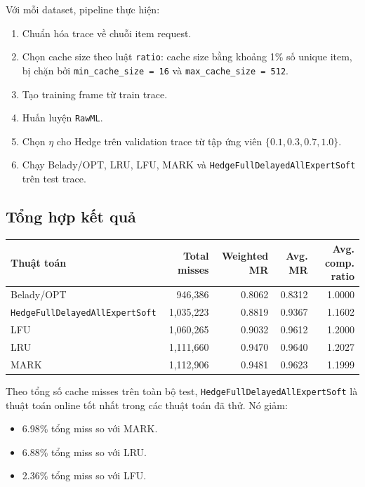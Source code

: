 \documentclass[11pt,a4paper]{article}
\newcommand{\code}[1]{\texttt{#1}}
\newcommand{\hedge}{\code{HedgeFullDelayedAllExpertSoft}}
\newcommand{\rawml}{\code{RawML}}
\begin{document}
Với mỗi dataset, pipeline thực hiện:

\begin{enumerate}[leftmargin=1.4em]
    \item Chuẩn hóa trace về chuỗi item request.
    \item Chọn cache size theo luật \code{ratio}: cache size bằng khoảng 1\% số unique item, bị chặn bởi \code{min\_cache\_size = 16} và \code{max\_cache\_size = 512}.
    \item Tạo training frame từ train trace.
    \item Huấn luyện \rawml{}.
    \item Chọn \(\eta\) cho Hedge trên validation trace từ tập ứng viên \(\{0.1, 0.3, 0.7, 1.0\}\).
    \item Chạy Belady/OPT, LRU, LFU, MARK và \hedge{} trên test trace.
\end{enumerate}

\subsection{Tổng hợp kết quả}

\begin{center}
\begin{tabular}{lrrrr}
\toprule
Thuật toán & Total misses & Weighted MR & Avg. MR & Avg. comp. ratio \\
\midrule
Belady/OPT & 946,386 & 0.8062 & 0.8312 & 1.0000 \\
\hedge{} & 1,035,223 & 0.8819 & 0.9367 & 1.1602 \\
LFU & 1,060,265 & 0.9032 & 0.9612 & 1.2000 \\
LRU & 1,111,660 & 0.9470 & 0.9640 & 1.2027 \\
MARK & 1,112,906 & 0.9481 & 0.9623 & 1.1999 \\
\bottomrule
\end{tabular}
\end{center}

Theo tổng số cache misses trên toàn bộ test, \hedge{} là thuật toán online tốt nhất trong các thuật toán đã thử. Nó giảm:

\begin{itemize}[leftmargin=1.4em]
    \item 6.98\% tổng miss so với MARK.
    \item 6.88\% tổng miss so với LRU.
    \item 2.36\% tổng miss so với LFU.
\end{itemize}
\end{document}
